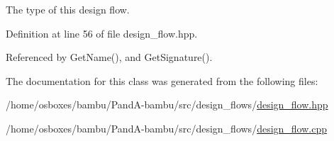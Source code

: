 The type of this design flow. 



Definition at line 56 of file design\+\_\+flow.\+hpp.



Referenced by Get\+Name(), and Get\+Signature().



The documentation for this class was generated from the following files\+:\begin{DoxyCompactItemize}
\item 
/home/osboxes/bambu/\+Pand\+A-\/bambu/src/design\+\_\+flows/\hyperlink{design__flow_8hpp}{design\+\_\+flow.\+hpp}\item 
/home/osboxes/bambu/\+Pand\+A-\/bambu/src/design\+\_\+flows/\hyperlink{design__flow_8cpp}{design\+\_\+flow.\+cpp}\end{DoxyCompactItemize}
